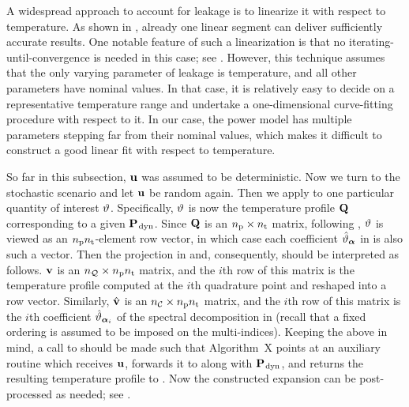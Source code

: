 \begin{remark}
A widespread approach to account for leakage is to linearize it with respect to temperature.
As shown in \cite{liu2007}, already one linear segment can deliver sufficiently accurate results.
One notable feature of such a linearization is that no iterating-until-convergence is needed in this case; see \cite{ukhov2012}.
However, this technique assumes that the only varying parameter of leakage is temperature, and all other parameters have nominal values.
In that case, it is relatively easy to decide on a representative temperature range and undertake a one-dimensional curve-fitting procedure with respect to it.
In our case, the power model has multiple parameters stepping far from their nominal values, which makes it difficult to construct a good linear fit with respect to temperature.
\end{remark}

So far in this subsection, $\mathbf{u}$ was assumed to be deterministic.
Now we turn to the stochastic scenario and let $\mathbf{u}$ be random again.
Then we apply  to one particular quantity of interest $\vartheta$.
Specifically, $\vartheta$ is now the temperature profile $\mathbf{Q}$ corresponding to a given $\mathbf{P}_{\text{\kern0.1emdyn}}$.
Since $\mathbf{Q}$ is an ${n_\text{p}} \times {n_\text{t}}$ matrix, following , $\vartheta$ is viewed as an ${n_\text{p}} {n_\text{t}}$-element row vector, in which case each coefficient $\hat{\vartheta}_{\bm{\alpha}}$ in  is also such a vector.
Then the projection in  and, consequently,  should be interpreted as follows.
$\mathbf{v}$ is an ${n_\mathcal{Q}} \times {n_\text{p}} {n_\text{t}}$ matrix, and the $i$th row of this matrix is the temperature profile computed at the $i$th quadrature point and reshaped into a row vector.
Similarly, $\hat{\mathbf{v}}$ is an ${n_\mathcal{C}} \times {n_\text{p}} {n_\text{t}}$ matrix, and the $i$th row of this matrix is the $i$th coefficient $\hat{\vartheta}_{\bm{\alpha}_i}$ of the spectral decomposition in  (recall that a fixed ordering is assumed to be imposed on the multi-indices).
Keeping the above in mind, a call to  should be made such that Algorithm~X points at an auxiliary routine which receives $\mathbf{u}$, forwards it to  along with $\mathbf{P}_{\text{\kern0.1emdyn}}$, and returns the resulting temperature profile to .
Now the constructed expansion can be post-processed as needed; see .

